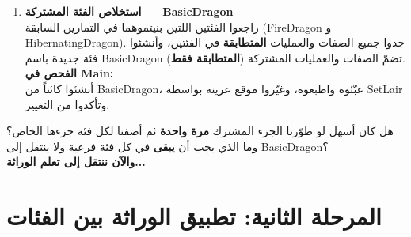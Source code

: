 \documentclass[14pt]{extarticle}
\begin{document}
\begin{enumerate}[label=\textbf{تمرين \arabic*:}, wide=0pt, leftmargin=*, itemsep=2.2em]
    \item \textbf{استخلاص الفئة المشتركة — \textenglish{BasicDragon}} \\
    راجعوا الفئتين اللتين بنيتموهما في التمارين السابقة (\textenglish{FireDragon} و \textenglish{HibernatingDragon}). جدوا جميع الصفات والعمليات \textbf{المتطابقة} في الفئتين، وأنشئوا فئة جديدة باسم \textenglish{BasicDragon} تضمّ الصفات والعمليات المشتركة (\textbf{المتطابقة فقط}). \\
    \textbf{الفحص في \textenglish{Main}:} \\
    أنشئوا كائناً من \textenglish{BasicDragon}، عبّئوه واطبعوه، وغيّروا موقع عرينه بواسطة \textenglish{SetLair} وتأكدوا من التغيير.

\end{enumerate}

\begin{boxAttention}
هل كان أسهل لو طوّرنا الجزء المشترك \textbf{مرة واحدة} ثم أضفنا لكل فئة جزءها الخاص؟ وما الذي يجب أن \textbf{يبقى} في كل فئة فرعية ولا ينتقل إلى \textenglish{BasicDragon}؟ \\
\textbf{والآن ننتقل إلى تعلم الوراثة...}
\end{boxAttention}

\clearpage

\section*{المرحلة الثانية: تطبيق الوراثة بين الفئات}
\end{document}
